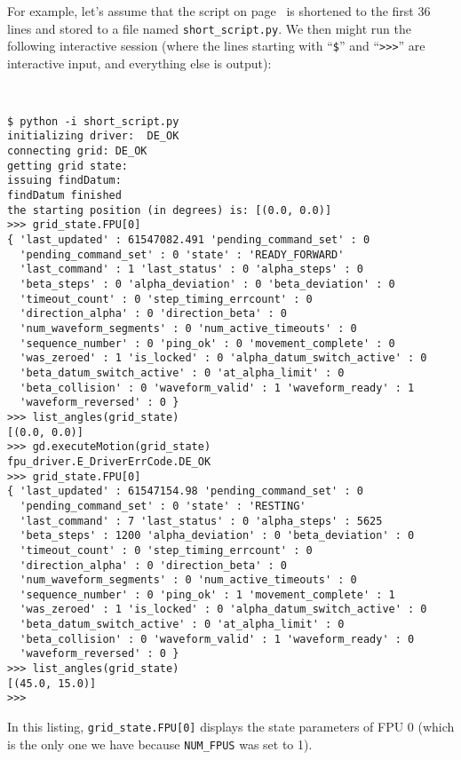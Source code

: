 \documentclass{scrartcl}[12pt,a4paper]
\begin{document}
For example, let's assume that the script on
page~\pageref{sec:minimalexample} is shortened to the first 36 lines
and stored to a file named \texttt{short\_script.py}. We then might
run the following interactive session (where the lines starting with
``\texttt{\$}'' and ``\verb+>>>+'' are interactive input, and
everything else is output):



\begin{verbatim}

  
$ python -i short_script.py
initializing driver:  DE_OK
connecting grid: DE_OK
getting grid state:
issuing findDatum:
findDatum finished
the starting position (in degrees) is: [(0.0, 0.0)]
>>> grid_state.FPU[0]
{ 'last_updated' : 61547082.491 'pending_command_set' : 0
  'pending_command_set' : 0 'state' : 'READY_FORWARD'
  'last_command' : 1 'last_status' : 0 'alpha_steps' : 0
  'beta_steps' : 0 'alpha_deviation' : 0 'beta_deviation' : 0
  'timeout_count' : 0 'step_timing_errcount' : 0
  'direction_alpha' : 0 'direction_beta' : 0
  'num_waveform_segments' : 0 'num_active_timeouts' : 0
  'sequence_number' : 0 'ping_ok' : 0 'movement_complete' : 0
  'was_zeroed' : 1 'is_locked' : 0 'alpha_datum_switch_active' : 0
  'beta_datum_switch_active' : 0 'at_alpha_limit' : 0
  'beta_collision' : 0 'waveform_valid' : 1 'waveform_ready' : 1
  'waveform_reversed' : 0 }
>>> list_angles(grid_state)
[(0.0, 0.0)]
>>> gd.executeMotion(grid_state)
fpu_driver.E_DriverErrCode.DE_OK
>>> grid_state.FPU[0]
{ 'last_updated' : 61547154.98 'pending_command_set' : 0
  'pending_command_set' : 0 'state' : 'RESTING'
  'last_command' : 7 'last_status' : 0 'alpha_steps' : 5625
  'beta_steps' : 1200 'alpha_deviation' : 0 'beta_deviation' : 0
  'timeout_count' : 0 'step_timing_errcount' : 0
  'direction_alpha' : 0 'direction_beta' : 0
  'num_waveform_segments' : 0 'num_active_timeouts' : 0
  'sequence_number' : 0 'ping_ok' : 1 'movement_complete' : 1
  'was_zeroed' : 1 'is_locked' : 0 'alpha_datum_switch_active' : 0
  'beta_datum_switch_active' : 0 'at_alpha_limit' : 0
  'beta_collision' : 0 'waveform_valid' : 1 'waveform_ready' : 0
  'waveform_reversed' : 0 }
>>> list_angles(grid_state)
[(45.0, 15.0)]
>>>
\end{verbatim}

In this listing, \verb+grid_state.FPU[0]+ displays the state parameters of
FPU 0 (which is the only one we have because \texttt{NUM\_FPUS} was
set to 1).
\end{document}
